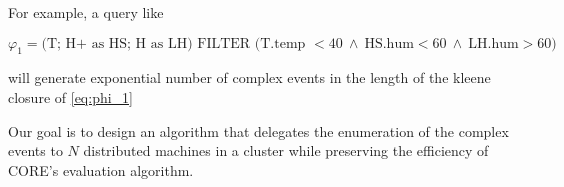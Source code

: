 For example, a query like

\begin{equation}
  \varphi_{1}= \text{(T; H+ as HS; H as LH) FILTER (T.temp } < 40 \ \land \ \text{HS.hum} < 60 \ \land \ \text{LH.hum} > 60)
  \label{eq:phi_1}
\end{equation}

will generate exponential number of complex events in the length of the kleene closure of \ref{eq:phi_1} \cite{on-the-expressiveness}

Our goal is to design an algorithm that delegates the enumeration of the complex events to $N$ distributed machines in a cluster while preserving the efficiency of CORE's evaluation algorithm.









